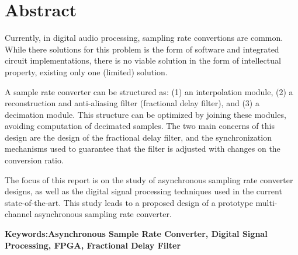 
\section*{Abstract}


Currently, in digital audio processing, sampling rate convertions
are common. While there solutions for this problem is the form of
software and integrated circuit implementations, there is no viable
solution in the form of intellectual property, existing only one
(limited) solution.

A sample rate converter can be structured as: (1) an interpolation
module, (2) a reconstruction and anti-aliasing filter
(fractional delay filter), and (3) a decimation module.
This structure can be optimized by joining these modules,
avoiding computation of decimated samples.
The two main concerns of this design are the design of the
fractional delay filter, and the synchronization mechanisms
used to guarantee that the filter is adjusted with changes
on the conversion ratio.

The focus of this report is on the study of asynchronous sampling rate
converter designs, as well as the digital signal processing
techniques used in the current state-of-the-art. This
study leads to a proposed design of a prototype multi-channel
asynchronous sampling rate converter.

\vfill

\textbf{\Large Keywords:Asynchronous Sample Rate Converter, Digital Signal Processing, FPGA, Fractional Delay Filter} 
